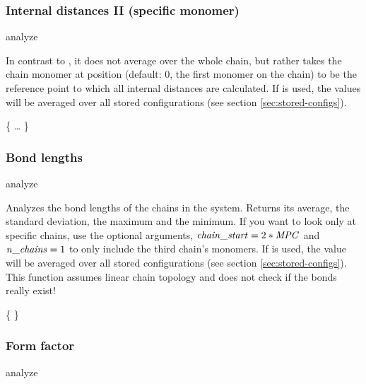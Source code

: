 \subsubsection{Internal distances II (specific monomer)}

\begin{essyntax}
  analyze   
\end{essyntax}
In contrast to , it does not average over
the whole chain, but rather takes the chain monomer at position
 (default: $0$, \ie the first monomer on the chain) to be
the reference point to which all internal distances are calculated. If
 is used, the values will be averaged over all stored
configurations (see section \vref{sec:stored-configs}).

\begin{code}
\{   \dots {} \}
\end{code}

\subsubsection{Bond lengths}
\begin{essyntax}
  analyze  
\end{essyntax}

Analyzes the bond lengths of the chains in the system.  Returns its average, the
standard deviation, the maximum and the minimum.  If you want to look
only at specific chains, use the optional arguments, \ie $\mathrm{\mathit{chain\_start}} =
2*\mathrm{\mathit{MPC}}$ and $\mathrm{\mathit{n\_chains}} = 1$ to only include the third
chain's monomers. If  is used, the value will be
averaged over all stored configurations (see section
\vref{sec:stored-configs}).
This function assumes linear chain topology and does not check 
if the bonds really exist!

\begin{code}
\{     \}
\end{code}

\subsubsection{Form factor}
\begin{essyntax}
  analyze  
    \\
\end{essyntax}

